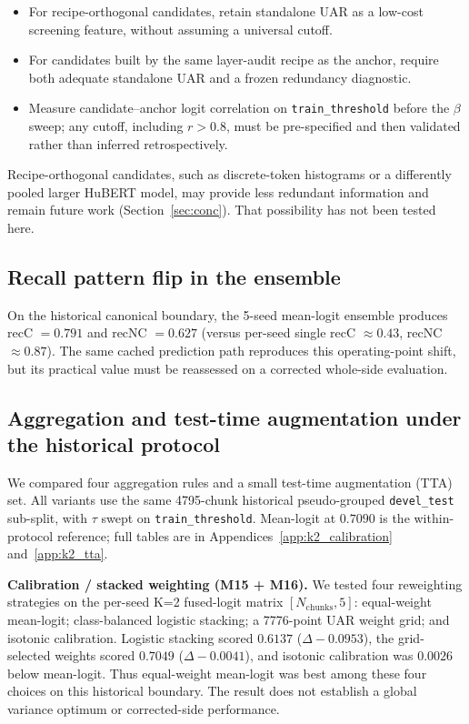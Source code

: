 \begin{itemize}
\item For recipe-orthogonal candidates, retain standalone UAR as a low-cost screening feature, without assuming a universal cutoff.
\item For candidates built by the same layer-audit recipe as the anchor, require both adequate standalone UAR and a frozen redundancy diagnostic.
\item Measure candidate--anchor logit correlation on \texttt{train\_threshold} before the $\beta$ sweep; any cutoff, including $r>0.8$, must be pre-specified and then validated rather than inferred retrospectively.
\end{itemize}

Recipe-orthogonal candidates, such as discrete-token histograms or a differently pooled larger HuBERT model, may provide less redundant information and remain future work (Section~\ref{sec:conc}). That possibility has not been tested here.

\subsection{Recall pattern flip in the ensemble}

On the historical canonical boundary, the 5-seed mean-logit ensemble produces recC $=0.791$ and recNC $=0.627$ (versus per-seed single recC $\approx0.43$, recNC $\approx0.87$). The same cached prediction path reproduces this operating-point shift, but its practical value must be reassessed on a corrected whole-side evaluation.

\subsection{Aggregation and test-time augmentation under the historical protocol}
\label{ssec:ensemble_defence}

We compared four aggregation rules and a small test-time augmentation (TTA) set. All variants use the same 4795-chunk historical pseudo-grouped \texttt{devel\_test} sub-split, with $\tau$ swept on \texttt{train\_threshold}. Mean-logit at $0.7090$ is the within-protocol reference; full tables are in Appendices~\ref{app:k2_calibration} and~\ref{app:k2_tta}.

\textbf{Calibration / stacked weighting (M15 + M16).} We tested four reweighting strategies on the per-seed K=2 fused-logit matrix $[N_{\text{chunks}},5]$: equal-weight mean-logit; class-balanced logistic stacking; a 7776-point UAR weight grid; and isotonic calibration. Logistic stacking scored $0.6137$ ($\Delta-0.0953$), the grid-selected weights scored $0.7049$ ($\Delta-0.0041$), and isotonic calibration was $0.0026$ below mean-logit. Thus equal-weight mean-logit was best among these four choices on this historical boundary. The result does not establish a global variance optimum or corrected-side performance.

